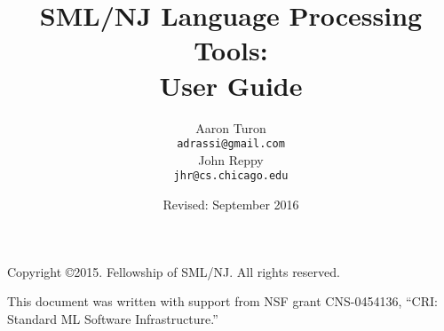 \documentclass[11pt,letterpaper]{book}
\title{
  SML/NJ Language Processing Tools:\\
  User Guide}
\author{
  Aaron Turon\\
  \texttt{adrassi@gmail.com}\\[0.5em]
  John Reppy\\
  \texttt{jhr@cs.chicago.edu}}
\date{Revised: September 2016}
\begin{document}
\frontmatter

	\maketitle
	
	\phantom{.}
	
	\noindent Copyright \copyright{}2015.  Fellowship of SML/NJ.  All rights reserved.
	
	\vskip 12pt
	\noindent This document was written with support from NSF grant CNS-0454136, ``CRI: Standard ML Software Infrastructure.''
	
	\pagebreak
	
	\tableofcontents

\mainmatter


	\newpage

	
	

	
		
		
		
		
		
	
%	
%		
%		


%		
%		


%	
%	
\end{document}
